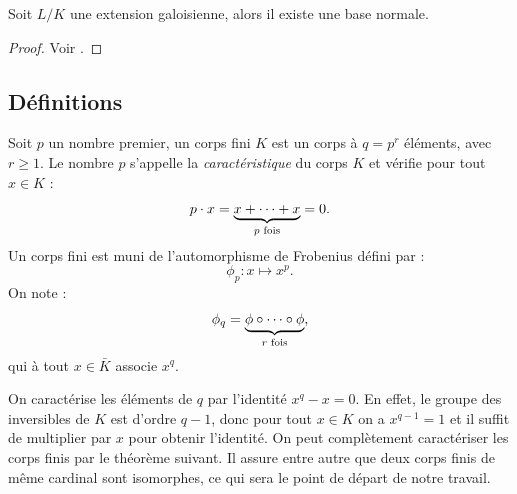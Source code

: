 \documentclass[a4paper]{article} %
\numberwithin{section}{part}
\numberwithin{equation}{section}
\begin{document}
\begin{thm}
Soit $L/K$ une extension galoisienne, alors il existe une base normale.
\end{thm}
\begin{proof}
Voir \cite[th. 3.72]{LiNi1}.
\end{proof}

\subsection{Définitions}
Soit $p$ un nombre premier, un corps fini $K$ est un corps à $q = p^r$ éléments,
avec $r\geq1$. Le nombre $p$ s'appelle la \emph{caractéristique} du corps $K$ et
vérifie pour tout $x\in K$ :
\begin{equation}
p\cdot x = \underbrace{x+\dots+x}_{p\textup{ fois}} = 0.
\end{equation}
Un corps fini est muni de l'automorphisme de Frobenius défini par :
\begin{equation}
\phi_p : x \mapsto x^p.
\end{equation}
On note :
\begin{equation}
\phi_q = \underbrace{\phi\circ\cdots\circ\phi}_{r\textup{
fois}},
\end{equation}
qui à tout $x\in \bar{K}$ associe $x^q$.\par
On caractérise les éléments de $q$ par l'identité $x^q - x = 0$. En effet, le
groupe des inversibles de $K$ est d'ordre $q-1$, donc pour tout $x\in K$ on a
$x^{q-1} = 1$ et il suffit de multiplier par $x$ pour obtenir l'identité.
On peut complètement caractériser les corps finis par le théorème suivant. Il
assure entre autre que deux corps finis de même cardinal sont isomorphes, ce qui
sera le point de départ de notre travail.
\end{document}
